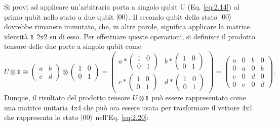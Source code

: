 Si provi ad applicare un'arbitraria porta a singolo qubit U (Eq. \ref{eq:2.14}) 
al primo qubit nello stato a due qubit $\ket{00}$. Il secondo qubit dello stato 
$\ket{00}$ dovrebbe rimanere immutato, che, in altre parole, significa applicare 
la matrice identità $\mathbb{1}$ 2x2 su di esso. Per effettuare queste operazioni, 
si definisce il prodotto tensore delle due porte a singolo qubit come 
\begin{equation}
    U\otimes\mathbb{1}\cong
    \begin{pmatrix}
        a&b\\c&d
    \end{pmatrix}
    \otimes
    \begin{pmatrix}
        1&0\\0&1
    \end{pmatrix}
    =
    \begin{pmatrix}
        a*
        \begin{pmatrix}
            1&0\\0&1
        \end{pmatrix}
        &b*
        \begin{pmatrix}
            1&0\\0&1
        \end{pmatrix}
        \\c*
        \begin{pmatrix}
            1&0\\0&1
        \end{pmatrix}
        &d*
        \begin{pmatrix}
            1&0\\0&1
        \end{pmatrix}
    \end{pmatrix}
    =
    \begin{pmatrix}
        a&0&b&0\\
        0&a&0&b\\
        c&0&d&0\\
        0&c&0&d
    \end{pmatrix}.
\end{equation} %
Dunque, il risultato del prodotto tensore $U\otimes\mathbb{1}$ può essere 
rappresentato come una matrice unitaria 4x4 che può ora essere usata per 
trasformare il vettore 4x1 che rappresenta lo stato $\ket{00}$ nell'Eq. \ref{eq:2.20}: 
